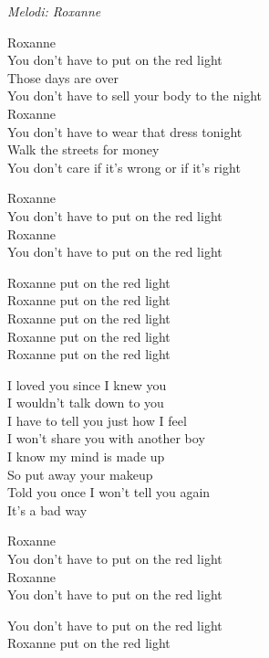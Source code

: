 {\footnotesize\textit{Melodi: Roxanne}}\par
\vspace{10pt}
Roxanne\\
You don't have to put on the red light\\
Those days are over\\
You don't have to sell your body to the night\\
Roxanne\\
You don't have to wear that dress tonight\\
Walk the streets for money\\
You don't care if it's wrong or if it's right\par
\vspace{10pt}
Roxanne\\
You don't have to put on the red light\\
Roxanne\\
You don't have to put on the red light\par
\vspace{10pt}
Roxanne put on the red light\\
Roxanne put on the red light\\
Roxanne put on the red light\\
Roxanne put on the red light\\
Roxanne put on the red light\par
\vspace{10pt}
I loved you since I knew you\\
I wouldn't talk down to you\\
I have to tell you just how I feel\\
I won't share you with another boy\\
I know my mind is made up\\
So put away your makeup\\
Told you once I won't tell you again\\
It's a bad way\par
\vspace{10pt}
Roxanne\\
You don't have to put on the red light\\
Roxanne\\
You don't have to put on the red light\par
\vspace{10pt}
You don't have to put on the red light\\
Roxanne put on the red light\\
